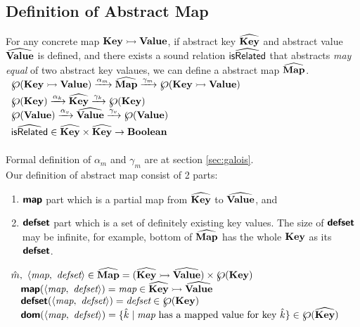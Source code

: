 \subsection{Definition of Abstract Map}
For any concrete map $\textbf{Key} \rightarrowtail \textbf{Value}$,
if abstract key $\widehat{\textbf{Key}}$ and abstract value $\widehat{\textbf{Value}}$ is defined,
and there exists a sound relation $\widehat{\textsf{isRelated}}$ 
that abstracts \emph{may equal} of two abstract key valaues,
we can define a abstract map $\widehat{\textbf{Map}}$.\\

$\begin{array}{l}
\poset(\CMap) \xrightarrow{\alpha_{m}}
\AMap \xrightarrow{\gamma_{m}} \poset(\CMap) \vspace{1mm} \\
\poset(\CKey) \xrightarrow{\alpha_{k}} 
\AKey \xrightarrow{\gamma_{k}} \poset(\CKey) \\
\poset(\CVal) \xrightarrow{\alpha_{v}} 
\AVal \xrightarrow{\gamma_{v}} \poset(\CVal) \vspace{1mm} \\
\wsf{isRelated} \in \AKey \times \AKey \rightarrow \textbf{Boolean} \\
\end{array}$\\\\
Formal definition of $\alpha_m$ and $\gamma_m$ are at section \ref{sec:galois}.\\
Our definition of abstract map consist of 2 parts:
\begin{enumerate}
\item $\textsf{\textbf{map}}$ part which is a partial map from $\widehat{\textbf{Key}}$ to $\widehat{\textbf{Value}}$, and
\item $\textsf{\textbf{defset}}$ part which is a set of definitely existing key values.
The size of $\textsf{\textbf{defset}}$ may be infinite, 
for example, bottom of $\widehat{\textbf{Map}}$ has the whole $\textbf{Key}$ as its $\textsf{\textbf{defset}}$.
\end{enumerate}
$\begin{array}{l}
\hat{m},\ \langle \emph{map},\ \emph{defset} \rangle
\in \AMap = (\AKey \rightarrowtail \AVal)
\times \poset(\CKey)\\
\quad \Map(\langle \emph{map},\ \emph{defset} \rangle) = 
\emph{map} \in \AKey \rightarrowtail \AVal \\
\quad \Defset(\langle \emph{map},\ \emph{defset} \rangle) = 
\emph{defset} \in \poset(\CKey) \\
\quad \Dom(\langle \emph{map},\ \emph{defset} \rangle) = 
\{ \hat{k} \mid \emph{map} 
\textrm{ has a mapped value for key } \hat{k} \} \in \poset(\AKey) \\
\end{array}$

